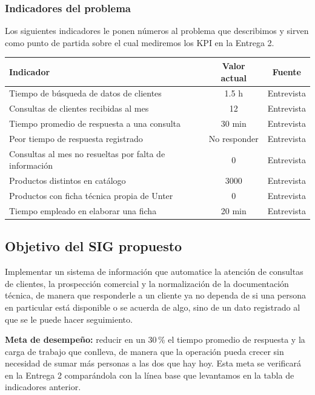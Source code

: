 \documentclass{article}
\begin{document}
\subsubsection*{Indicadores del problema}

Los siguientes indicadores le ponen números al problema que describimos y sirven como punto de partida sobre el cual mediremos los KPI en la Entrega 2.

\begin{table}[H]
\centering
\begin{tabularx}{\textwidth}{Lcc}
\toprule
\textbf{Indicador} & \textbf{Valor actual} & \textbf{Fuente} \\
\midrule
Tiempo de búsqueda de datos de clientes & 1.5 h & Entrevista \\
Consultas de clientes recibidas al mes & 12 & Entrevista \\
Tiempo promedio de respuesta a una consulta & 30 min & Entrevista \\
Peor tiempo de respuesta registrado & No responder & Entrevista \\
Consultas al mes no resueltas por falta de información & 0 & Entrevista \\
Productos distintos en catálogo & 3000 & Entrevista \\
Productos con ficha técnica propia de Unter & 0 & Entrevista \\
Tiempo empleado en elaborar una ficha & 20 min & Entrevista \\
\bottomrule
\end{tabularx}
\end{table}

\subsection{Objetivo del SIG propuesto}

Implementar un sistema de información que automatice la atención de consultas de clientes, la prospección comercial y la normalización de la documentación técnica, de manera que responderle a un cliente ya no dependa de si una persona en particular está disponible o se acuerda de algo, sino de un dato registrado al que se le puede hacer seguimiento.

\medskip
\noindent\textbf{Meta de desempeño:} reducir en un 30\,\% el tiempo promedio de respuesta y la carga de trabajo que conlleva, de manera que la operación pueda crecer sin necesidad de sumar más personas a las dos que hay hoy. Esta meta se verificará en la Entrega 2 comparándola con la línea base que levantamos en la tabla de indicadores anterior.
\end{document}
